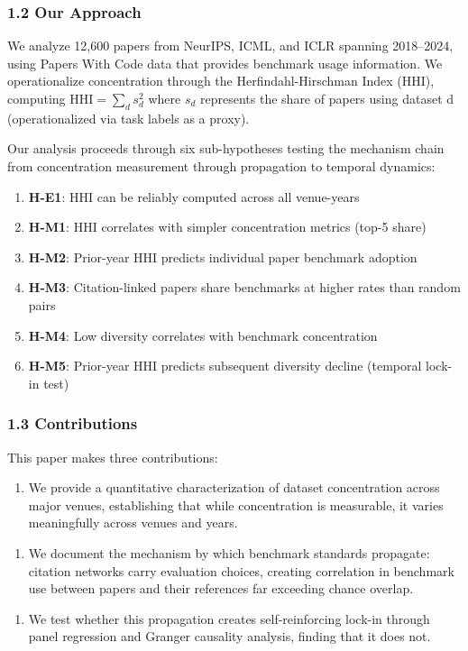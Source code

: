 \subsubsection{1.2 Our Approach}

We analyze 12,600 papers from NeurIPS, ICML, and ICLR spanning 2018--2024, using Papers With Code data that provides benchmark usage information. We operationalize concentration through the Herfindahl-Hirschman Index (HHI), computing $\text{HHI} = \sum_d s_d^2$ where $s_d$ represents the share of papers using dataset d (operationalized via task labels as a proxy).

Our analysis proceeds through six sub-hypotheses testing the mechanism chain from concentration measurement through propagation to temporal dynamics:

\begin{enumerate}
\item \textbf{H-E1}: HHI can be reliably computed across all venue-years
\item \textbf{H-M1}: HHI correlates with simpler concentration metrics (top-5 share)
\item \textbf{H-M2}: Prior-year HHI predicts individual paper benchmark adoption
\item \textbf{H-M3}: Citation-linked papers share benchmarks at higher rates than random pairs
\item \textbf{H-M4}: Low diversity correlates with benchmark concentration
\item \textbf{H-M5}: Prior-year HHI predicts subsequent diversity decline (temporal lock-in test)
\end{enumerate}

\subsubsection{1.3 Contributions}

This paper makes three contributions:

\begin{enumerate}
\item We provide a quantitative characterization of dataset concentration across major venues, establishing that while concentration is measurable, it varies meaningfully across venues and years.
\end{enumerate}

\begin{enumerate}
\item We document the mechanism by which benchmark standards propagate: citation networks carry evaluation choices, creating correlation in benchmark use between papers and their references far exceeding chance overlap.
\end{enumerate}

\begin{enumerate}
\item We test whether this propagation creates self-reinforcing lock-in through panel regression and Granger causality analysis, finding that it does not.
\end{enumerate}

